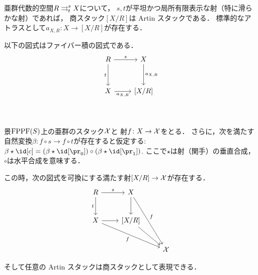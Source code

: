     \begin{Prop}
        亜群代数的空間$R \mathrel{\mathop{\rightrightarrows}^{s}_{t}} X$について，
        $s,t$が平坦かつ局所有限表示な射（特に滑らかな射）であれば，
        商スタック$[X/R]$は Artin スタックである．
        標準的なアトラスとして$a_{X,R} \colon X \to [X/R]$が存在する．
    \end{Prop}

    \begin{Prop}[\cite{SP} 04MB]
        以下の図式はファイバー積の図式である．
        \[
        \begin{tikzcd}[row sep=30pt]
            R \ar[r, "s"] \ar[d, "t"'] & X \ar[d, "a_{X,R}"] \\
            X \ar[r, "a_{X,R}"'] & \lbrack X/R \rbrack \\
        \end{tikzcd}
        \]
    \end{Prop}

    \begin{Prop}[\cite{SP} 044U] \label{prop:grpd_2_coeq}
        景$\mathrm{FPPF}(S)$上の亜群のスタック$\mathcal{X}$と
        射$f \colon X \to \mathcal{X}$をとる．
        さらに，次を満たす自然変換$\beta \colon f \circ s \to f \circ t$が存在すると仮定する:
        $\beta \star \id[c] = (\beta \star \id[\pr_0]) \circ (\beta \star \id[\pr_1])$.
        ここで$\star$は射（関手）の垂直合成，$\circ$は水平合成を意味する．

        この時，次の図式を可換にする満たす射$[X/R] \to \mathcal{X}$が存在する．
        \[
        \begin{tikzcd}[row sep=25pt]
            R \ar[r, "s"] \ar[d, "t"'] & X \ar[d] \ar[ddr, "f"] \\
            X \ar[r] \ar[rrd, "f"'] & \lbrack X/R \rbrack \ar[rd] \\
            {} & {} &  \stX
        \end{tikzcd}
        \]
    \end{Prop}

    そして任意の Artin スタックは商スタックとして表現できる．

